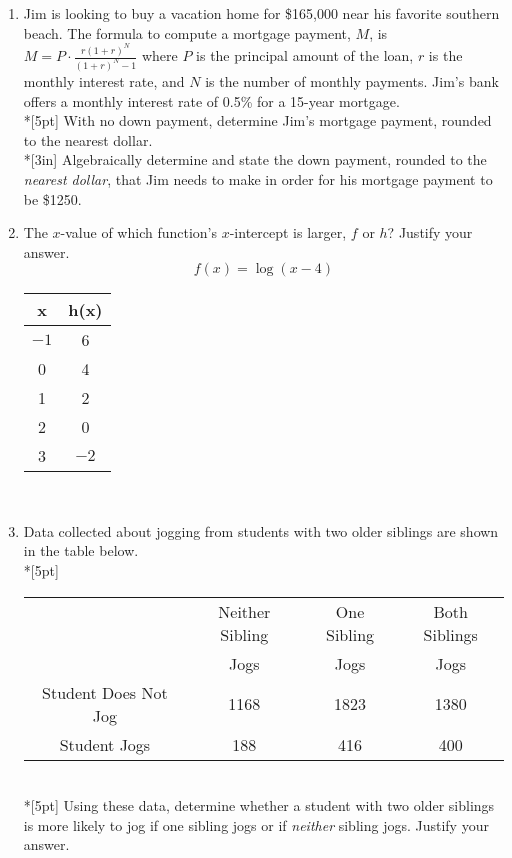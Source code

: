 \documentclass[12pt, oneside]{article}
\begin{document}
\begin{enumerate}
\newpage
\item Jim is looking to buy a vacation home for \$165,000 near his favorite southern beach. The formula to compute a mortgage payment, $M$, is $\displaystyle M=P \cdot \frac{r(1+r)^N}{(1+r)^N-1}$ where $P$ is the principal amount of the loan, $r$ is the monthly interest rate, and $N$ is the number of monthly payments. Jim’s bank offers a monthly interest rate of 0.5\% for a 15-year mortgage.\\*[5pt]
With no down payment, determine Jim’s mortgage payment, rounded to the nearest dollar.\\*[3in]
Algebraically determine and state the down payment, rounded to the \emph{nearest dollar}, that Jim needs to make in order for his mortgage payment to be \$1250.

\newpage
\item The $x$-value of which function's $x$-intercept is larger, $f$ or $h$? Justify your answer. \[f(x)=\log (x-4) \]
\begin{tabular}{|c|c|}
\hline 
x & h(x)\\ 
\hline 
$-1$ & 6 \\ 
\hline 
0 & 4 \\ 
\hline 
1 & 2 \\ 
\hline 
2 & 0 \\ 
\hline 
3 & $-2$ \\ 
\hline 
\end{tabular}\\[2in] %

\item Data collected about jogging from students with two older siblings are shown in the table below.\\*[5pt]
\begin{tabular}{|c|c|c|c|}
\hline 
& Neither Sibling & One Sibling & Both Siblings\\ 
& Jogs & Jogs & Jogs\\\hline 
Student Does Not Jog & 1168 & 1823 & 1380 \\ 
\hline 
Student Jogs & 188 & 416 & 400 \\ 
\hline 
\end{tabular}\\*[5pt]
Using these data, determine whether a student with two older siblings is more likely to jog if one sibling jogs or if \emph{neither} sibling jogs. Justify your answer. %




\end{enumerate}
\end{document}
